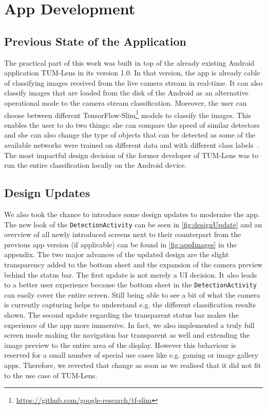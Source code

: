\documentclass[
			   fontsize=11pt,
               paper=a4,
               bibliography=totoc,
               idxtotoc,
               headsepline,
               footsepline,
               footinclude=false,
               BCOR=12mm,
               DIV=13,
               openany,   %
               ]
               {scrbook}
\newcommand{\code}[1]{\lstinline[basicstyle = \ttfamily\small]{#1}} %
\begin{document}
\part{App Development}

\chapter{Previous State of the Application} \label{sec:previousState}

The practical part of this work was built in top of the already existing Android application TUM-Lens in its version 1.0. In that version, the app is already cable of classifying images received from the live camera stream in real-time. It can also classify images that are loaded from the disk of the Android as an alternative operational mode to the camera stream classification. Moreover, the user can choose between different TensorFlow-Slim\footnote{\url{https://github.com/google-research/tf-slim}} models to classify the images. This enables the user to do two things: she can compare the speed of similar detectors and she can also change the type of objects that can be detected as some of the available networks were trained on different data and with different class labels~\cite{maxJokel}. The most impactful design decision of the former developer of TUM-Lens was to run the entire classification locally on the Android device.

\chapter{Design Updates}

We also took the chance to introduce some design updates to modernise the app. The new look of the \code{DetectionActivity} can be seen in \autoref{fig:designUpdate} and an overview of all newly introduced screens next to their counterpart from the previous app version (if applicable) can be found in \autoref{fig:appImages} in the appendix. The two major advances of the updated design are the slight transparency added to the bottom sheet and the expansion of the camera preview behind the status bar. The first update is not merely a UI decision. It also leads to a better user experience because the bottom sheet in the \code{DetectionActivity} can easily cover the entire screen. Still being able to see a bit of what the camera is currently capturing helps to understand e.g. the different classification results shown. The second update regarding the transparent status bar makes the experience of the app more immersive. In fact, we also implemented a truly full screen mode making the navigation bar transparent as well and extending the image preview to the entire area of the display. However this behaviour is reserved for a small number of special use cases like e.g. gaming or image gallery apps. Therefore, we reverted that change as soon as we realised that it did not fit to the use case of TUM-Lens.
\end{document}
